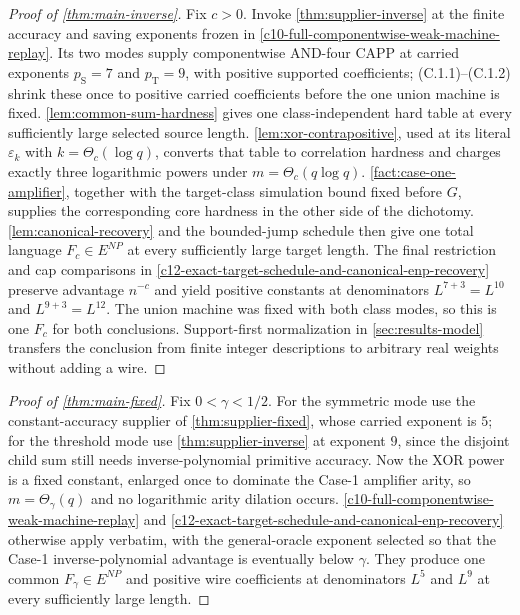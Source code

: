 \documentclass[11pt,letterpaper]{article}
\newcommand{\cref}[1]{\ref{#1}}
\theoremstyle{definition}
\theoremstyle{remark}
\begin{document}
\begin{proof}[Proof of \cref{thm:main-inverse}] Fix \(c>0\). Invoke \cref{thm:supplier-inverse} at the
finite accuracy and saving exponents frozen in \cref{c10-full-componentwise-weak-machine-replay}. Its two
modes supply componentwise AND-four CAPP at carried exponents
\(p_{\mathrm S}=7\) and \(p_{\mathrm T}=9\), with positive supported
coefficients; (C.1.1)--(C.1.2) shrink these once to positive carried
coefficients before the one union machine is fixed. \cref{lem:common-sum-hardness} gives
one class-independent hard table at every sufficiently large selected
source length. \cref{lem:xor-contrapositive}, used at its literal \(\varepsilon_k\) with
\(k=\Theta_c(\log q)\), converts that table to correlation hardness and
charges exactly three logarithmic powers under \(m=\Theta_c(q\log q)\).
\cref{fact:case-one-amplifier}, together with the target-class simulation bound fixed before
\(G\), supplies the corresponding core hardness in the other side of the
dichotomy. \cref{lem:canonical-recovery} and the bounded-jump schedule then give one
total language \(F_c\in E^{NP}\) at every sufficiently large target
length. The final restriction and cap comparisons in \cref{c12-exact-target-schedule-and-canonical-enp-recovery}
preserve advantage \(n^{-c}\) and yield positive constants at
denominators \(L^{7+3}=L^{10}\) and \(L^{9+3}=L^{12}\). The union
machine was fixed with both class modes, so this is one \(F_c\) for both
conclusions. Support-first normalization in \cref{sec:results-model} transfers the conclusion
from finite integer descriptions to arbitrary real weights without
adding a wire. \end{proof}

\begin{proof}[Proof of \cref{thm:main-fixed}] Fix \(0<\gamma<1/2\). For the symmetric
mode use the constant-accuracy supplier of \cref{thm:supplier-fixed}, whose carried
exponent is \(5\); for the threshold mode use \cref{thm:supplier-inverse} at exponent
\(9\), since the disjoint child sum still needs inverse-polynomial
primitive accuracy. Now the XOR power is a fixed constant, enlarged once
to dominate the Case-1 amplifier arity, so \(m=\Theta_\gamma(q)\) and no
logarithmic arity dilation occurs. \cref{c10-full-componentwise-weak-machine-replay}
and \cref{c12-exact-target-schedule-and-canonical-enp-recovery} otherwise
apply verbatim, with the general-oracle exponent selected so that the
Case-1 inverse-polynomial advantage is eventually below \(\gamma\). They
produce one common \(F_\gamma\in E^{NP}\) and positive wire coefficients
at denominators \(L^5\) and \(L^9\) at every sufficiently large length.
\end{proof}
\end{document}
